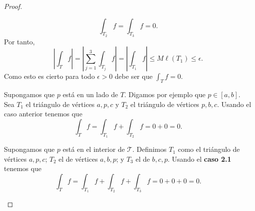 \begin{proof}
\begin{description}
\begin{description}
		\[\int _{T_{2}}f =\int _{T_{3}}f =0 .\]
		Por tanto, 
		\[ \left|\int _{T}f \right|= \left|\sum^{3}_{j=1}\int _{T_{j}}f \right|= \left|\int _{T_{1}}f \right|\leq M \ell\left(T_{1}\right) \leq \epsilon  .\]
		Como esto es cierto para todo $\displaystyle \epsilon > 0 $ debe ser que $\displaystyle \int _{T}f =0 $. 
	\item[Caso 2.2.] Supongamos que $\displaystyle p $ está en un lado de $\displaystyle T $. Digamos por ejemplo que $\displaystyle p \in \left[a,b\right]  $. Sea $\displaystyle T_{1} $ el triángulo de vértices $\displaystyle a,p,c $ y $\displaystyle T_{2} $ el triángulo de vértices $\displaystyle p,b,c $. Usando el caso anterior tenemos que 
		\[\int _{T}f =\int _{T_{1}}f +\int _{T_{2}}f = 0 + 0 = 0 .\]
	\item[Caso 2.3.] Supongamos que $\displaystyle p $ está en el interior de $\displaystyle \mathcal{T} $. Definimos $\displaystyle T_{1} $ como el triángulo de vértices $\displaystyle a,p,c $; $\displaystyle T_{2} $ el de vértices $\displaystyle a,b,p $; y $\displaystyle T_{3} $ el de $\displaystyle b,c,p $. 
		Usando el \textbf{caso 2.1} tenemos que 
		\[\int _{T}f =\int _{T_{1}}f +\int _{T_{2}}f +\int _{T_{3}}f =0 + 0 + 0 = 0 .\]
	\end{description}
	\end{description}
\end{proof}

